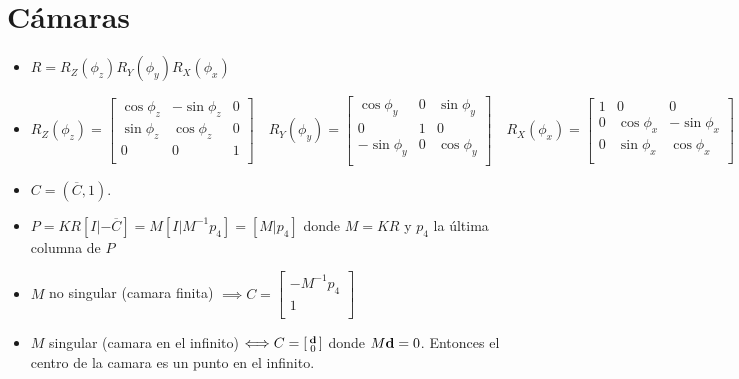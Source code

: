\documentclass[12pt,a4paper]{article}
\begin{document}
\section{C\'amaras}

\begin{itemize}

	\item $R = R_{Z}(\phi_{z})R_{Y}(\phi_{y})R_{X}(\phi_{x})$

\item $
	R_{Z}(\phi_{z}) =
	\left[ {\begin{smallmatrix}
	 \cos{\phi_{z}} & -\sin{\phi_{z}} & 0 \\
	 \sin{\phi_{z}} & \cos{\phi_{z}} & 0 \\
	 0 & 0 & 1\\
	\end{smallmatrix} } \right] \quad R_{Y}(\phi_{y}) =
	\left[ {\begin{smallmatrix}
		\cos{\phi_{y}} & 0 & \sin{\phi_{y}}\\
		 0 & 1 & 0\\
	    -\sin{\phi_{y}} & 0 & \cos{\phi_{y}}\\
	\end{smallmatrix} } \right] \quad R_{X}(\phi_{x}) =
	\left[ {\begin{smallmatrix}
		1 & 0 & 0\\ 
	    0 & \cos{\phi_{x}} & -\sin{\phi_{x}}\\
	    0 & \sin{\phi_{x}} & \cos{\phi_{x}}\\
	\end{smallmatrix} } \right]
	$

	\item $C = (\overline{C}, 1)$.

	\item $P = KR [I |- \overline{C}] = M[I|M^{-1}p_{4}] = [M|p_{4}]$ donde $M= KR$ y $p_{4}$ la \'ultima columna de $P$

	\item $M$ no singular (camara finita) $\implies C = \left[ {\begin{smallmatrix}
		-M^{-1}p_{4}\\ 
		 1\\
	\end{smallmatrix} } \right]$ 

	\item $M$ singular (camara en el infinito) $\Longleftrightarrow C = \left[ {\begin{smallmatrix}
		{\bf d}\\ 
		0\\
	\end{smallmatrix} } \right]$ donde $M {\bf d} = 0$. Entonces el centro de la camara es un punto en el infinito.


\end{itemize}
\end{document}
